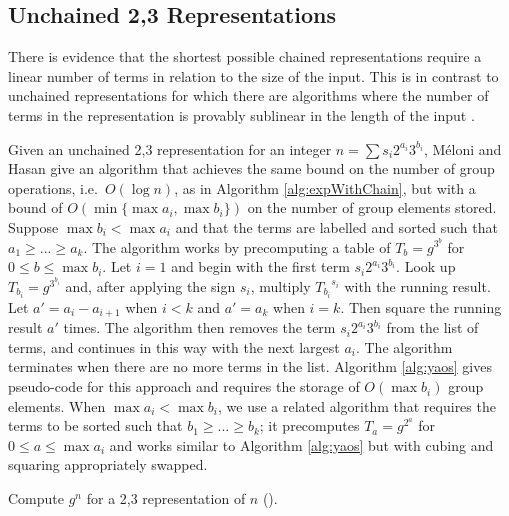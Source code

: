 \documentclass{ucalgthes1}
\theoremstyle{definition}
\newcommand{\algnewline}{\par\noindent\hskip\algorithmicindent}
\newcommand{\ZZgez}{\mathbb{Z}_{\ge 0}}
\begin{document}
\subsection{Unchained 2,3 Representations}
\label{subsec:dbnsReps}

There is evidence \cite{Imbert2010} that the shortest possible chained representations require a linear number of terms in relation to the size of the input.  This is in contrast to unchained representations for which there are algorithms where the number of terms in the representation is provably sublinear in the length of the input \cite{Dimitrov2008, Ciet2005}.

Given an unchained 2,3 representation for an integer $n = \sum s_i 2^{a_i} 3^{b_i}$, M\'{e}loni and Hasan \cite[Section 3.2]{Meloni2009} give an algorithm that achieves the same bound on the number of group operations, i.e.\ $O(\log n)$, as in Algorithm \ref{alg:expWithChain}, but with a bound of $O(\min \{\max a_i, \max b_i\})$ on the number of group elements stored.  Suppose $\max b_i < \max a_i$ and that the terms are labelled and sorted such that $a_1 \ge ... \ge a_k$.  The algorithm works by precomputing a table of $T_b = g^{3^b}$ for $0 \le b \le \max b_i$.  Let $i=1$ and begin with the first term $s_i2^{a_i}3^{b_i}$.  Look up $T_{b_i} = g^{3^{b_i}}$ and, after applying the sign $s_i$, multiply ${T_{b_i}}^{s_i}$ with the running result.  Let $a' = a_i - a_{i+1}$ when $i < k$ and $a' = a_k$ when $i = k$.  Then square the running result $a'$ times.  The algorithm then removes the term $s_i2^{a_i}3^{b_i}$ from the list of terms, and continues in this way with the next largest $a_i$.  The algorithm terminates when there are no more terms in the list.  Algorithm  \ref{alg:yaos} gives pseudo-code for this approach and requires the storage of $O(\max b_i)$ group elements.  When $\max a_i < \max b_i$, we use a related algorithm that requires the terms to be sorted such that $b_1 \ge ... \ge b_k$; it precomputes $T_a = g^{2^a}$ for $0 \le a \le \max a_i$ and works similar to Algorithm \ref{alg:yaos} but with cubing and squaring appropriately swapped.

\begin{algorithm}[htb]
\caption{Compute $g^n$ for a 2,3 representation of $n$ (\cite[Section 3.2]{Meloni2009}).}
\label{alg:yaos}
\end{algorithm}
\end{document}
